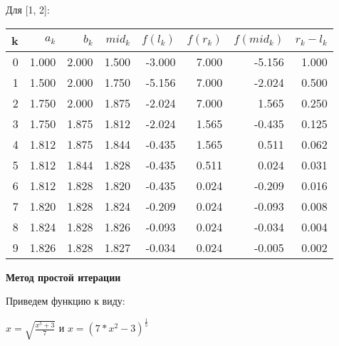 \documentclass[]{article}
\begin{document}
Для [1, 2]:
\begin{center}
\begin{tabular}{ |r|r r r r r r r| }
\hline
k & $a_k$ & $b_k$ & $mid_k$ & $f(l_k)$ & $f(r_k)$ & $f(mid_k)$ & $r_k-l_k$\\
\hline
0 & 1.000 & 2.000 & 1.500 & -3.000 & 7.000 & -5.156 & 1.000 \\
1 & 1.500 & 2.000 & 1.750 & -5.156 & 7.000 & -2.024 & 0.500 \\
2 & 1.750 & 2.000 & 1.875 & -2.024 & 7.000 & 1.565 & 0.250 \\
3 & 1.750 & 1.875 & 1.812 & -2.024 & 1.565 & -0.435 & 0.125 \\
4 & 1.812 & 1.875 & 1.844 & -0.435 & 1.565 & 0.511 & 0.062 \\
5 & 1.812 & 1.844 & 1.828 & -0.435 & 0.511 & 0.024 & 0.031 \\
6 & 1.812 & 1.828 & 1.820 & -0.435 & 0.024 & -0.209 & 0.016 \\
7 & 1.820 & 1.828 & 1.824 & -0.209 & 0.024 & -0.093 & 0.008 \\
8 & 1.824 & 1.828 & 1.826 & -0.093 & 0.024 & -0.034 & 0.004 \\
9 & 1.826 & 1.828 & 1.827 & -0.034 & 0.024 & -0.005 & 0.002 \\
\hline
\end{tabular}
\end{center}

\newpage
\begin{center}
	\huge\textbf{Метод простой итерации}
\end{center}

Приведем функцию к виду:

$x = \sqrt{\frac{x^5 + 3}{7}}$
и
$x = (7*x^2 -3)^{\frac{1}{5}}$

~

\begin{center}
\end{center}
\end{document}
